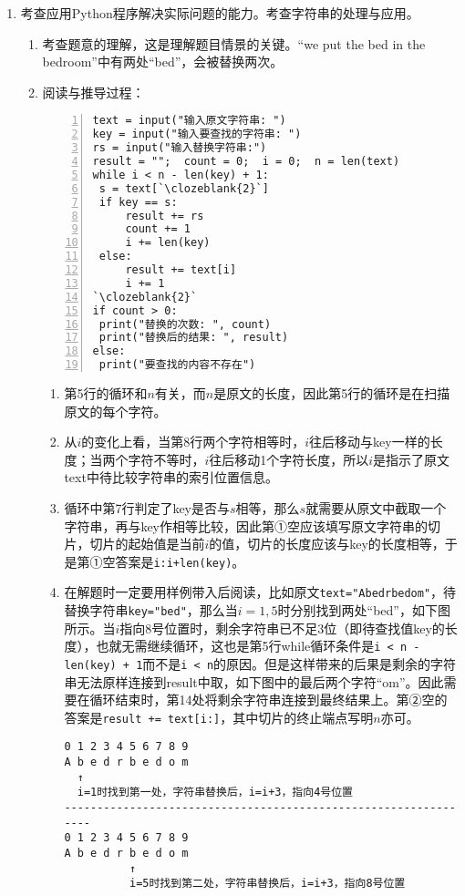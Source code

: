 \begin{enumerate}
\item 考查应用Python程序解决实际问题的能力。考查字符串的处理与应用。
	\begin{enumerate}[label=$(\arabic*)$]
	\item 考查题意的理解，这是理解题目情景的关键。“we put the bed in the bedroom”中有两处“bed”，会被替换两次。	
	\item 阅读与推导过程：
\setcounter{qnumber}{1}
\begin{lstlisting}[numbers=left]
text = input("输入原文字符串: ")
key = input("输入要查找的字符串: ")
rs = input("输入替换字符串:")
result = "";  count = 0;  i = 0;  n = len(text)
while i < n - len(key) + 1:
 s = text[`\clozeblank{2}`]
 if key == s:
     result += rs
     count += 1
     i += len(key)
 else:
     result += text[i]
     i += 1
`\clozeblank{2}`
if count > 0:
 print("替换的次数: ", count)
 print("替换后的结果: ", result)
else:
 print("要查找的内容不存在")
\end{lstlisting}
		\begin{enumerate}[label=$(\alph*)$]
		\item 第5行的循环和$n$有关，而$n$是原文的长度，因此第5行的循环是在扫描原文的每个字符。
		\item 从$i$的变化上看，当第8行两个字符相等时，$i$往后移动与key一样的长度；当两个字符不等时，$i$往后移动1个字符长度，所以$i$是指示了原文text中待比较字符串的索引位置信息。
		\item 循环中第7行判定了key是否与$s$相等，那么$s$就需要从原文中截取一个字符串，再与key作相等比较，因此第①空应该填写原文字符串的切片，切片的起始值是当前$i$的值，切片的长度应该与key的长度相等，于是第①空答案是\lstinline|i:i+len(key)|。
		\item 在解题时一定要用样例带入后阅读，比如原文\lstinline|text="Abedrbedom"|，待替换字符串\lstinline|key="bed"|，那么当$i=1,5$时分别找到两处“bed”，如下图所示。当$i$指向8号位置时，剩余字符串已不足3位（即待查找值key的长度），也就无需继续循环，这也是第5行while循环条件是\lstinline|i < n - len(key) + 1|而不是\lstinline|i < n|的原因。但是这样带来的后果是剩余的字符串无法原样连接到result中取，如下图中的最后两个字符“om”。因此需要在循环结束时，第14处将剩余字符串连接到最终结果上。第②空的答案是\lstinline|result += text[i:]|，其中切片的终止端点写明$n$亦可。
\begin{lstlisting}
0 1 2 3 4 5 6 7 8 9
A b e d r b e d o m
  ↑
  i=1时找到第一处，字符串替换后，i=i+3，指向4号位置
----------------------------------------------------------------
0 1 2 3 4 5 6 7 8 9
A b e d r b e d o m
          ↑
          i=5时找到第二处，字符串替换后，i=i+3，指向8号位置
\end{lstlisting}
		\end{enumerate}
	\end{enumerate}


\end{enumerate}

